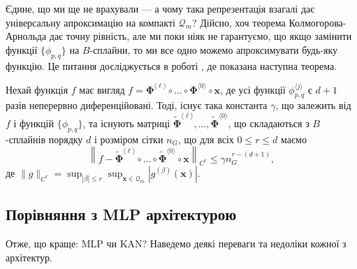 Єдине, що ми ще не врахували --- а чому така репрезентація взагалі дає універсальну 
апроксимацію на компакті $\mathcal{Q}_m$? Дійсно, хоч теорема Колмогорова-Арнольда
дає точну рівність, але ми поки ніяк не гарантуємо, що якщо замінити функції 
$\{\phi_{p,q}\}$ на $B$-сплайни, то ми все одно можемо апроксимувати будь-яку
функцію. Це питання досліджується в роботі \cite{kan}, де показана наступна теорема.

\begin{theorem}
	Нехай функція $f$ має вигляд $f = \boldsymbol{\Phi}^{\langle\ell\rangle}
	\circ \dots \circ \boldsymbol{\Phi}^{\langle 0\rangle} \circ \mathbf{x}$, де
	усі функції $\phi_{p,q}^{\langle j \rangle}$ є $d+1$ разів неперервно
	диференційовані. Тоді, існує така константа $\gamma$, що залежить від $f$ і
	функцій $\{\phi_{p,q}\}$, та існують матриці
	$\widetilde{\boldsymbol{\Phi}}^{\langle\ell\rangle},\dots,\widetilde{\boldsymbol{\Phi}}^{\langle
	0\rangle}$, що складаються з $B$-сплайнів порядку $d$ і розміром сітки $n_G$, що
	для всіх $0 \leq r \leq d$ маємо
	\begin{equation*}
		\left\| f - \widetilde{\boldsymbol{\Phi}}^{\langle\ell\rangle}
		\circ \dots \circ \widetilde{\boldsymbol{\Phi}}^{\langle 0\rangle} \circ \mathbf{x} \right\|_{C^r} \leq \gamma n_G^{r-(d+1)},
	\end{equation*}
	де $\|g\|_{C^r} = \sup_{|\beta|\leq r}\sup_{\mathbf{x} \in \mathcal{Q}_m}|g^{(\beta)}(\mathbf{x})|$.
\end{theorem}

\subsection{Порівняння з MLP архітектурою}

Отже, що краще: MLP чи KAN? Наведемо деякі переваги та недоліки кожної з архітектур.

